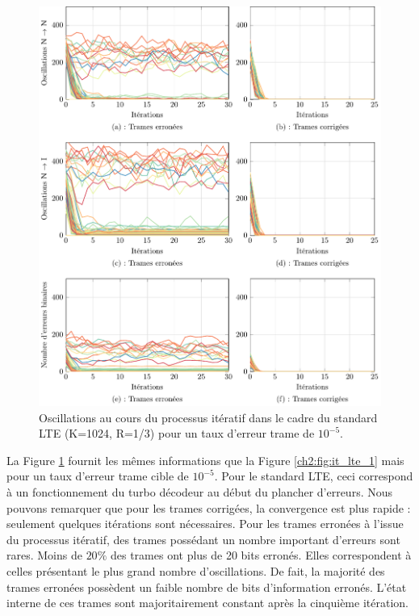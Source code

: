 \begin{figure}[!h]
	\hspace*{-.7cm}
	\begin{center}
	\includegraphics[width=.9\textwidth]{main/ch2_fig/tikz/it_lte10-5.pdf}
	\caption{Oscillations au cours du processus itératif dans le cadre du standard LTE (K=1024, R=1/3) pour un taux 
	d'erreur trame de $10^{-5}$. 
	\label{ch2:fig:it_lte_2}}
	\end{center}
\end{figure}

La Figure \ref{ch2:fig:it_lte_2} fournit les mêmes informations que la Figure \ref{ch2:fig:it_lte_1} mais pour un 
taux d'erreur trame cible de $10^{-5}$. Pour le standard LTE, ceci correspond à un fonctionnement du 
turbo décodeur au début du plancher d'erreurs. Nous pouvons remarquer que pour les trames corrigées, la convergence est 
plus rapide : seulement quelques itérations sont nécessaires. Pour les trames erronées à l'issue 
du processus itératif, des trames possédant un nombre important d'erreurs sont rares. Moins de $20\%$ des trames ont plus de
20 bits erronés. Elles correspondent à celles 
présentant le plus grand nombre d'oscillations. De fait, la majorité des trames erronées possèdent un faible nombre 
de bits d'information erronés. L'état interne de ces trames sont majoritairement constant après la cinquième itération.


